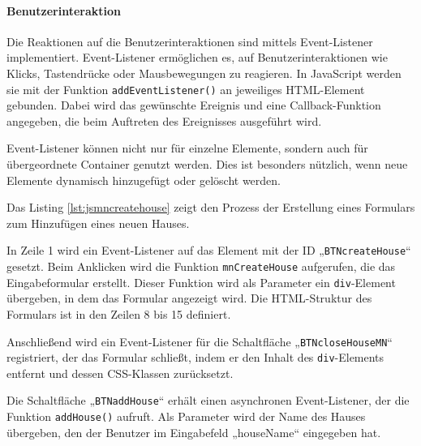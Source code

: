 \documentclass[12pt, letterpaper]{article}
\begin{document}
  \paragraph{Benutzerinteraktion}
  \par \textbf{}
  \par Die Reaktionen auf die Benutzerinteraktionen sind mittels Event-Listener implementiert. Event-Listener ermöglichen es, auf Benutzerinteraktionen wie Klicks, Tastendrücke oder Mausbewegungen zu reagieren. In JavaScript werden sie mit der Funktion \texttt{addEventListener()} an jeweiliges HTML-Element gebunden. Dabei wird das gewünschte Ereignis und eine Callback-Funktion angegeben, die beim Auftreten des Ereignisses ausgeführt wird.
  \par Event-Listener können nicht nur für einzelne Elemente, sondern auch für übergeordnete Container genutzt werden. Dies ist besonders nützlich, wenn neue Elemente dynamisch hinzugefügt oder gelöscht werden. 
  \par Das Listing \ref{lst:jsmncreatehouse} zeigt den Prozess der Erstellung eines Formulars zum Hinzufügen eines neuen Hauses. 
  \par In Zeile 1 wird ein Event-Listener auf das Element mit der ID „\texttt{BTNcreateHouse}“ gesetzt. Beim Anklicken wird die Funktion \texttt{mnCreateHouse} aufgerufen, die das Eingabeformular erstellt. Dieser Funktion wird als Parameter ein \texttt{div}-Element übergeben, in dem das Formular angezeigt wird. Die HTML-Struktur des Formulars ist in den Zeilen 8 bis 15 definiert.
  \par Anschließend wird ein Event-Listener für die Schaltfläche „\texttt{BTNcloseHouseMN}“ registriert, der das Formular schließt, indem er den Inhalt des \texttt{div}-Elements entfernt und dessen CSS-Klassen zurücksetzt.
  \par Die Schaltfläche „\texttt{BTNaddHouse}“ erhält einen asynchronen Event-Listener, der die Funktion \texttt{addHouse()} aufruft. Als Parameter wird der Name des Hauses übergeben, den der Benutzer im Eingabefeld „houseName“ eingegeben hat.
  
\end{document}
